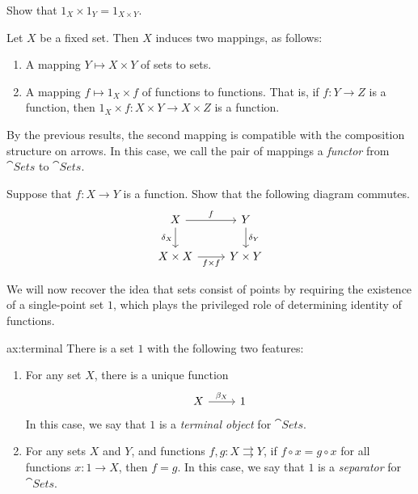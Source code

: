 \begin{exercise} Show that $1_X\times 1_Y=1_{X\times
    Y}$. \end{exercise}

\begin{defn} Let $X$ be a fixed set.  Then $X$ induces two mappings,
  as follows:
\begin{enumerate}
\item A mapping $Y\mapsto X\times Y$ of sets to sets.  
\item A mapping $f\mapsto 1_X\times f$ of functions to functions.
  That is, if $f:Y\to Z$ is a function, then $1_X\times f:X\times Y\to
  X\times Z$ is a function.  \end{enumerate} By the previous results,
the second mapping is compatible with the composition structure on
arrows.  In this case, we call the pair of mappings a \emph{functor}
from $\cat{Sets}$ to $\cat{Sets}$. \end{defn}

\begin{exercise} Suppose that $f:X\to Y$ is a function.  Show that the
  following diagram commutes.
  \[ \begin{tikzcd}
    X \arrow[r,"f"] \arrow[d,"\dl _X"']  & Y \arrow[d,"\dl _Y"] \\
    X\times X \arrow[r,"f\times f"'] & Y\times
    Y \end{tikzcd} \] \end{exercise}


We will now recover the idea that sets consist of points by requiring
the existence of a single-point set $1$, which plays the privileged
role of determining identity of functions.

\begin{axi}{ax:terminal} There is a set $1$
  with the following two features:
\begin{enumerate}
\item For any set $X$, there is a unique function
  \[ \begin{tikzcd} X \arrow[r,"\beta _X"] & 1 \end{tikzcd} \] In this
  case, we say that $1$ is a \emph{terminal object} for $\cat{Sets}$.
\item For any sets $X$ and $Y$, and functions $f,g:X\rightrightarrows
  Y$, if $f\circ x=g\circ x$ for all functions $x:1\to X$, then $f=g$.
  In this case, we say that $1$ is a \emph{separator} for
  $\cat{Sets}$. \end{enumerate} \label{ax:terminal} \end{axi}

